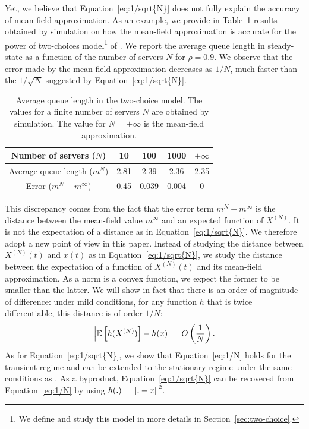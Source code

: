 \documentclass[acmlarge]{acmart}
\newcommand\XN{X^{(N)}}
\newcommand\esp[1]{{\mathchoice{\besp{#1}}{\sesp{#1}}{\sesp{#1}}{\sesp{#1}}}}
\newcommand\besp[1]{\mathbb{E}\left[#1\right]}
\newcommand\sesp[1]{\mathbb{E}[#1]}
\newcommand\norm[1]{{\mathchoice{\bnorm{#1}}{\snorm{#1}}{\snorm{#1}}{\snorm{#1}}}}
\newcommand\bnorm[1]{\left\|#1\right\|}
\newcommand\snorm[1]{\|#1\|}
\newcommand\abs[1]{\left|#1\right|}
\newcommand\p[1]{\left(#1\right)}
\begin{document}
Yet, we believe that Equation~\eqref{eq:1/sqrt{N}} does not fully
explain the accuracy of mean-field approximation. As an example, we
provide in Table~\ref{tab:power2} results obtained by simulation on
how the mean-field approximation is accurate for the power of
two-choices model\footnote{We define and study this model in more
  details in Section~\ref{sec:two-choice}.} of
\cite{mitzenmacher1996power,vvedenskaya1996queueing}. We report the
average queue length in steady-state as a function of the number of
servers $N$ for $\rho=0.9$. We observe that the error made by the
mean-field approximation decreases as $1/N$, much faster than the
$1/\sqrt{N}$ suggested by Equation~\eqref{eq:1/sqrt{N}}.

\begin{table}[ht]
  \centering
  \begin{tabular}{|c|c|c|c|c|}
    \hline
    Number of servers ($N$) & 10 & 100 & 1000 &$+\infty$\\\hline
    Average queue length ($m^N$) &2.81&2.39&2.36& 2.35\\\hline
    Error ($m^N-m^\infty$) & 0.45 & 0.039 & 0.004 & 0 \\\hline
  \end{tabular}
  \caption{Average queue length in the two-choice model. The values for a
    finite number of servers
    $N$ are obtained by simulation. The value for $N=+\infty$ is the
    mean-field approximation. }
  \label{tab:power2}
\end{table}

This discrepancy comes from the fact that the error term
$m^N-m^\infty$ is the distance between the mean-field value $m^\infty$
and an expected function of $\XN$. It is not the expectation of a
distance as in Equation~\eqref{eq:1/sqrt{N}}. We therefore adopt a new
point of view in this paper. Instead of studying the distance between
$\XN(t)$ and $x(t)$ as in Equation~\eqref{eq:1/sqrt{N}}, we study the
distance between the expectation of a function of $\XN(t)$ and its
mean-field approximation.  As a norm is a convex function, we expect
the former to be smaller than the latter. We will show in fact that
there is an order of magnitude of difference: under mild conditions,
for any function $h$ that is twice differentiable, this distance is of
order $1/N$:
\begin{align}
  \label{eq:1/N}
  \abs{\esp{h(\XN)} - h(x)} = O\p{\frac1N}.
\end{align}
As for Equation~\eqref{eq:1/sqrt{N}}, we show that
Equation~\eqref{eq:1/N} holds for the transient regime and can be
extended to the stationary regime under the same conditions as
\cite{ying2016rate}.  As a byproduct, Equation~\eqref{eq:1/sqrt{N}}
can be recovered from Equation~\eqref{eq:1/N} by using
$h(.)=\norm{.-x}^2$.
\end{document}
